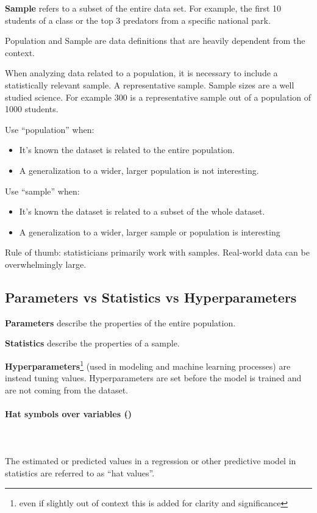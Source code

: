 \documentclass{article}
\begin{document}
\textbf{Sample} refers to a subset of the entire data set. 
For example, the first 10 students of a class or the top 3 predators from a specific national park.

Population and Sample are data definitions that are heavily dependent from the context.

When analyzing data related to a population, it is necessary to include a statistically relevant sample. A representative sample. 
Sample sizes are a well studied science. 
For example 300 is a representative sample out of a population of 1000 students.

Use “population” when:
\begin{itemize}
    \item It’s known the dataset is related to the entire population.
    \item A generalization to a wider, larger population is not interesting.
\end{itemize}

Use “sample” when:
\begin{itemize}
    \item It’s known the dataset is related to a subset of the whole dataset.
    \item A generalization to a wider, larger sample or population is interesting
\end{itemize}

Rule of thumb: statisticians primarily work with samples. Real-world data can be overwhelmingly large.

\subsection{Parameters vs Statistics vs Hyperparameters}

\textbf{Parameters} describe the properties of the entire population.

\textbf{Statistics} describe the properties of a sample.

\textbf{Hyperparameters}\footnote{even if slightly out of context this is added for clarity and significance} (used in modeling and machine learning processes) are instead tuning values. Hyperparameters are set before the model is trained and are not coming from the dataset. 

\paragraph{Hat symbols over variables ($\hat{}$)}\mbox{} \\ 
\mbox{} \\
The estimated or predicted values in a regression or other predictive model in statistics are referred to as “hat values”. 
\end{document}
